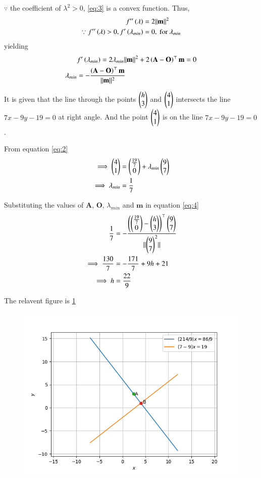 \documentclass[journal,12pt,twocolumn]{IEEEtran}
\renewcommand{\vec}[1]{\boldsymbol{\mathbf{#1}}}
\begin{document}
$\because$ the coefficient of $\lambda^2> 0$, \eqref{eq:3} is a convex function.
Thus,
\begin{align}
    f^{\prime\prime}\brak{\lambda}                                            & = 2\norm{\vec{m}}^2             \\
    \because f^{\prime\prime}\brak{\lambda} > 0, f^\prime\brak{\lambda_{min}} & = 0, \text{ for } \lambda_{min}
\end{align}
yielding
\begin{align}
                  & f^\prime\brak{\lambda_{min}} =  2\lambda_{min}\norm{\vec{m}}^2 + 2\brak{\vec{A}-\vec{O}}^\top\vec{m}  = 0 \\
    \label{eq:4}
    \lambda_{min} & = -\frac{\brak{\vec{A}-\vec{O}}^\top\vec{m}}{\norm{\vec{m}}^2}
\end{align}

It is given that the line through the points $\begin{pmatrix}h \\ 3\end{pmatrix}$ and $\begin{pmatrix}4 \\ 1\end{pmatrix}$ intersects the line $7{x} - 9{y} - 19 = 0$ at right angle. And the point $\begin{pmatrix}4 \\ 1\end{pmatrix}$ is on the line $7{x} - 9{y} - 19 = 0$.

From equation \eqref{eq:2}
\begin{align}
    \implies \begin{pmatrix}4 \\ 1\end{pmatrix} &= \begin{pmatrix}\frac{19}{7} \\ 0\end{pmatrix} + \lambda_{min}\begin{pmatrix}9 \\ 7\end{pmatrix} \\
    \implies \lambda_{min} &= \frac{1}{7} 
\end{align}


Substituting the values of $\vec{A}$, $\vec{O}$, $\lambda_{min}$ and $\vec{m}$ in equation \eqref{eq:4}
\begin{align}
    \frac{1}{7} &= -\frac{\left(\begin{pmatrix}\frac{19}{7} \\ 0\end{pmatrix} -\begin{pmatrix}h \\ 3\end{pmatrix}\right)^\top\begin{pmatrix}9 \\ 7\end{pmatrix}}{\lVert\begin{pmatrix}9 \\ 7\end{pmatrix}^2\rVert}\\
    \implies \frac{130}{7} &= -\frac{171}{7} + 9{h} + 21\\
    \implies h &= \frac{22}{9}
\end{align}

The relavent figure is \ref{fig:line}

\begin{figure}[!htb]
    \centering
    \includegraphics[width=\columnwidth]{figs/lines.png}
    \caption{}
    \label{fig:line}
\end{figure}
\end{document}
